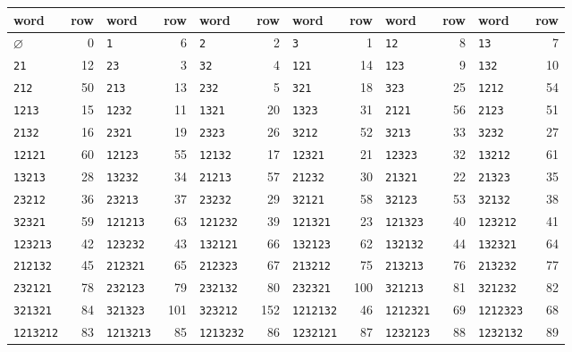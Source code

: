 \begin{table}[!ht]
\centering\footnotesize
\setlength{\tabcolsep}{3pt}
\begin{tabular}{lr lr lr lr lr lr }
\toprule
word & row & word & row & word & row & word & row & word & row & word & row\\
\midrule
$\varnothing$ & 0 & \texttt{1} & 6 & \texttt{2} & 2 & \texttt{3} & 1 & \texttt{12} & 8 & \texttt{13} & 7\\
\texttt{21} & 12 & \texttt{23} & 3 & \texttt{32} & 4 & \texttt{121} & 14 & \texttt{123} & 9 & \texttt{132} & 10\\
\texttt{212} & 50 & \texttt{213} & 13 & \texttt{232} & 5 & \texttt{321} & 18 & \texttt{323} & 25 & \texttt{1212} & 54\\
\texttt{1213} & 15 & \texttt{1232} & 11 & \texttt{1321} & 20 & \texttt{1323} & 31 & \texttt{2121} & 56 & \texttt{2123} & 51\\
\texttt{2132} & 16 & \texttt{2321} & 19 & \texttt{2323} & 26 & \texttt{3212} & 52 & \texttt{3213} & 33 & \texttt{3232} & 27\\
\texttt{12121} & 60 & \texttt{12123} & 55 & \texttt{12132} & 17 & \texttt{12321} & 21 & \texttt{12323} & 32 & \texttt{13212} & 61\\
\texttt{13213} & 28 & \texttt{13232} & 34 & \texttt{21213} & 57 & \texttt{21232} & 30 & \texttt{21321} & 22 & \texttt{21323} & 35\\
\texttt{23212} & 36 & \texttt{23213} & 37 & \texttt{23232} & 29 & \texttt{32121} & 58 & \texttt{32123} & 53 & \texttt{32132} & 38\\
\texttt{32321} & 59 & \texttt{121213} & 63 & \texttt{121232} & 39 & \texttt{121321} & 23 & \texttt{121323} & 40 & \texttt{123212} & 41\\
\texttt{123213} & 42 & \texttt{123232} & 43 & \texttt{132121} & 66 & \texttt{132123} & 62 & \texttt{132132} & 44 & \texttt{132321} & 64\\
\texttt{212132} & 45 & \texttt{212321} & 65 & \texttt{212323} & 67 & \texttt{213212} & 75 & \texttt{213213} & 76 & \texttt{213232} & 77\\
\texttt{232121} & 78 & \texttt{232123} & 79 & \texttt{232132} & 80 & \texttt{232321} & 100 & \texttt{321213} & 81 & \texttt{321232} & 82\\
\texttt{321321} & 84 & \texttt{321323} & 101 & \texttt{323212} & 152 & \texttt{1212132} & 46 & \texttt{1212321} & 69 & \texttt{1212323} & 68\\
\texttt{1213212} & 83 & \texttt{1213213} & 85 & \texttt{1213232} & 86 & \texttt{1232121} & 87 & \texttt{1232123} & 88 & \texttt{1232132} & 89\\

\end{tabular}
\end{table}
